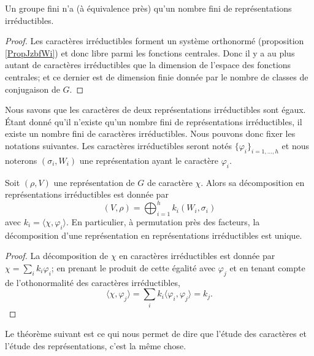 \begin{lemma}
    Un groupe fini n'a (à équivalence près) qu'un nombre fini de représentations irréductibles.
\end{lemma}

\begin{proof}
    Les caractères irréductibles forment un système orthonormé (proposition \ref{PropJzbfWi}) et donc libre parmi les fonctions centrales. Donc il y a au plus autant de caractères irréductibles que la dimension de l'espace des fonctions centrales; et ce dernier est de dimension finie donnée par le nombre de classes de conjugaison de \( G\).
\end{proof}

Nous savons que les caractères de deux représentations irréductibles sont égaux. Étant donné qu'il n'existe qu'un nombre fini de représentations irréductibles, il existe un nombre fini de caractères irréductibles. Nous pouvons donc fixer les notations suivantes. Les caractères irréductibles seront notés \( \{ \varphi_i \}_{i=1,\ldots, h}\) et nous noterons \( (\sigma_i,W_i)\) une représentation ayant le caractère \( \varphi_i\).

\begin{theorem}
    Soit \( (\rho,V)\) une représentation de \( G\) de caractère \( \chi\). Alors sa décomposition en représentations irréductibles est donnée par
    \begin{equation}
        (V,\rho)=\bigoplus_{i=1}^hk_i(W_i,\sigma_i)
    \end{equation}
    avec \( k_i=\langle \chi, \varphi_i\rangle \). En particulier, à permutation près des facteurs, la décomposition d'une représentation en représentations irréductibles est unique.
\end{theorem}

\begin{proof}
    La décomposition de \( \chi\) en caractères irréductibles est donnée par \( \chi=\sum_ik_i\varphi_i\); en prenant le produit de cette égalité avec \( \varphi_j\) et en tenant compte de l'othonormalité des caractères irréductibles,
    \begin{equation}
        \langle \chi, \varphi_j\rangle =\sum_ik_i\langle \varphi_i, \varphi_j\rangle =k_j.
    \end{equation}
\end{proof}

Le théorème suivant est ce qui nous permet de dire que l'étude des caractères et l'étude des représentations, c'est la même chose.

